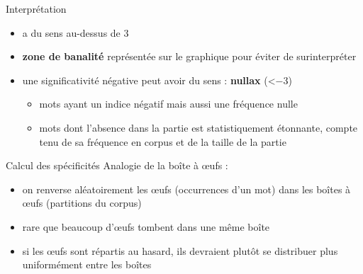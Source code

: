 \documentclass[xetex,xcolor={table,usenames,dvipsnames}]{beamer}
\begin{document}
\begin{frame}{Interprétation}
\begin{itemize}
\item a du sens au-dessus de 3
\item \textbf{zone de banalité} représentée sur le graphique pour éviter de surinterpréter
\item une significativité négative peut avoir du sens : \textbf{nullax} (<−\textsc{3})
\begin{itemize}
	\item mots ayant un indice négatif mais aussi une fréquence nulle
	\item mots dont l’absence dans la partie est statistiquement
	étonnante, compte tenu de sa fréquence en corpus et de la taille de la partie 
\end{itemize}
\end{itemize}
\begin{flushright}
	{\small \citep{pincemin2022semantique}}
\end{flushright}
\end{frame}



\begin{frame}{Calcul des spécificités}
		Analogie de la boîte à \oe{}ufs :
	\begin{itemize}
		\item on renverse aléatoirement les \oe{}ufs (occurrences d'un mot) dans les boîtes à \oe{}ufs (partitions du corpus)
		\item rare que beaucoup d'œufs tombent dans une même boîte
		\item si les œufs sont répartis au hasard, ils devraient plutôt se distribuer plus uniformément entre les boîtes
	\end{itemize}
\end{frame}
\end{document}
